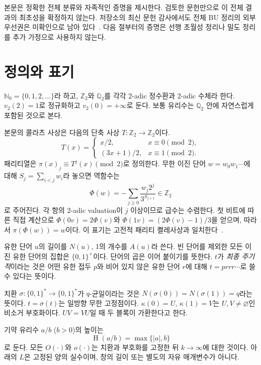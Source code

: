 \documentclass[11pt,a4paper]{article}
\theoremstyle{koreanplain}
\newcommand{\Q}{\mathbb Q}
\newcommand{\Z}{\mathbb Z}
\newcommand{\N}{\mathbb N}
\newcommand{\vTwo}{v_2}
\newcommand{\htQ}{\operatorname{H}}
\begin{document}
본문은 정확한 전체 분류와 자족적인 증명을 제시한다. 검토한 문헌만으로 이 전체 결과의 최초성을 확정하지 않는다. 저장소의 최신 문헌 감사에서도 전체 BU 정리의 외부 우선권은 미확인으로 남아 있다~\cite{Repo2026}. 다음 절부터의 증명은 선행 초월성 정리나 밀도 정리를 추가 가정으로 사용하지 않는다.

\section{정의와 표기}

$\N_0=\{0,1,2,\ldots\}$라 하고, $\Z_2$와 $\Q_2$를 각각 2-adic 정수환과 2-adic 수체라 한다. $\vTwo(2)=1$로 정규화하고 $\vTwo(0)=+\infty$로 둔다. 보통 유리수는 $\Q_2$ 안에 자연스럽게 포함된 것으로 본다.

본문의 콜라츠 사상은 다음의 단축 사상 $T:\Z_2\to\Z_2$이다.
\begin{equation}\label{eq:T}
T(x)=\begin{cases}
x/2,&x\equiv0\pmod2,\\
(3x+1)/2,&x\equiv1\pmod2.
\end{cases}
\end{equation}
패리티열은 $\pi(x)_j\equiv T^j(x)\pmod2$로 정의한다. 무한 이진 단어 $w=w_0w_1\cdots$에 대해 $S_j=\sum_{i<j}w_i$라 놓으면 역함수는
\begin{equation}\label{eq:Phi}
\Phi(w)=-\sum_{j\ge0}\frac{w_j2^j}{3^{S_{j+1}}}\in\Z_2
\end{equation}
로 주어진다. 각 항의 2-adic valuation이 $j$ 이상이므로 급수는 수렴한다. 첫 비트에 따른 직접 계산으로 $\Phi(0v)=2\Phi(v)$와 $\Phi(1v)=(2\Phi(v)-1)/3$을 얻으며, 따라서 $\pi(\Phi(w))=w$이다. 이 표기는 고전적 패리티 켤레사상과 일치한다~\cite{BL1996}.

유한 단어 $u$의 길이를 $N(u)$, 1의 개수를 $A(u)$라 쓴다. 빈 단어를 제외한 모든 이진 유한 단어의 집합은 $\{0,1\}^{+}$이다. 단어의 곱은 이어 붙이기를 뜻한다. $t$가 \emph{최종 주기적}이라는 것은 어떤 유한 접두 $p$와 비어 있지 않은 유한 단어 $r$에 대해 $t=prrr\cdots$로 쓸 수 있다는 뜻이다.

치환 $\sigma:\{0,1\}^{*}\to\{0,1\}^{*}$가 $q$-균일이라는 것은 $N(\sigma(0))=N(\sigma(1))=q$라는 뜻이다. $t=\sigma(t)$는 일방향 무한 고정점이다. $\kappa(0)=U$, $\kappa(1)=V$는 $U,V\ne\varnothing$인 비소거 부호화이다. $UV=VU$일 때 두 블록이 가환한다고 한다.

기약 유리수 $a/b$ ($b>0$)의 높이는
\begin{equation}\label{eq:height}
\htQ(a/b)=\max\{|a|,b\}
\end{equation}
로 둔다. 모든 $O(\cdot)$와 $o(\cdot)$는 치환과 부호화를 고정한 뒤 $k\to\infty$에 대한 것이다. 아래의 $L$은 고정된 양의 실수이며, 창의 길이 또는 별도의 자유 매개변수가 아니다.
\end{document}
